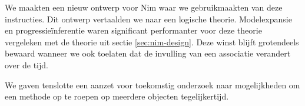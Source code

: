 We maakten een nieuw ontwerp voor Nim waar we gebruikmaakten van deze instructies. Dit ontwerp vertaalden we naar een logische theorie. Modelexpansie en progressie\"inferentie waren significant performanter voor deze theorie vergeleken met de theorie uit sectie \ref{sec:nim-design}. Deze winst blijft grotendeels bewaard wanneer we ook toelaten dat de invulling van een associatie verandert over de tijd.

We gaven tenslotte een aanzet voor toekomstig onderzoek naar mogelijkheden om een methode op te roepen op meerdere objecten tegelijkertijd.